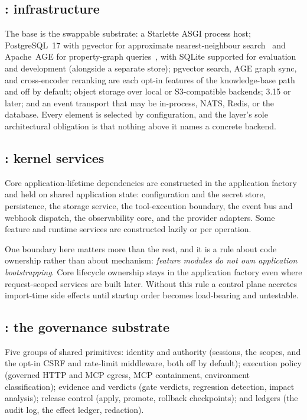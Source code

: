 \subsection{: infrastructure}

The base is the swappable substrate: a Starlette ASGI process host; PostgreSQL~17
with pgvector for approximate nearest-neighbour search~\cite{pgvector,malkov2020hnsw}
and Apache~AGE for property-graph queries~\cite{apacheage}, with SQLite supported
for evaluation and development (alongside a separate \mlflow{} store); pgvector
search, AGE graph sync, and cross-encoder reranking are each opt-in features of the
knowledge-base path and off by default; object storage over local or S3-compatible backends;
\mlflow{} 3.15 or later; and an event transport that may be in-process, NATS,
Redis, or the database. Every element is selected by configuration, and the layer's
sole architectural obligation is that nothing above it names a concrete backend.

\subsection{: kernel services}

Core application-lifetime dependencies are constructed in the application factory
and held on shared application state: configuration and the secret store,
persistence, the storage service, the tool-execution boundary, the event bus and
webhook dispatch, the observability core, and the provider adapters. Some feature
and runtime services are constructed lazily or per operation.

One boundary here matters more than the rest, and it is a rule about code
ownership rather than about mechanism: \emph{feature modules do not own
application bootstrapping}. Core lifecycle ownership stays in the application
factory even where request-scoped services are built later. Without this rule a
control plane accretes import-time side effects until startup order becomes
load-bearing and untestable.

\subsection{: the governance substrate}

Five groups of shared primitives: identity and authority (sessions, the
\statScopesW{} scopes, and the opt-in CSRF and rate-limit middleware, both off by
default); execution policy (governed HTTP and MCP
egress, MCP containment, environment classification); evidence and verdicts (gate
verdicts, regression detection, impact analysis); release control (apply, promote,
rollback checkpoints); and ledgers (the audit log, the effect ledger, redaction).

